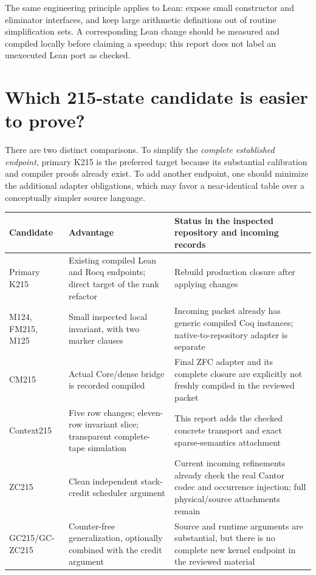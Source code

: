 \documentclass[11pt]{article}
\begin{document}
The same engineering principle applies to Lean: expose small constructor and eliminator interfaces, and keep large arithmetic definitions out of routine simplification sets. A corresponding Lean change should be measured and compiled locally before claiming a speedup; this report does not label an unexecuted Lean port as checked.

\section{Which 215-state candidate is easier to prove?}

There are two distinct comparisons. To simplify the \emph{complete established endpoint}, primary K215 is the preferred target because its substantial calibration and compiler proofs already exist. To add another endpoint, one should minimize the additional adapter obligations, which may favor a near-identical table over a conceptually simpler source language.

\begin{longtable}{@{}>{\raggedright\arraybackslash}p{}>{\raggedright\arraybackslash}p{}>{\raggedright\arraybackslash}p{}@{}}
\toprule
Candidate & Advantage & Status in the inspected repository and incoming records\\
\midrule\endhead
Primary K215 & Existing compiled Lean and Rocq endpoints; direct target of the rank refactor & Rebuild production closure after applying changes\\
M124, FM215, M125 & Small inspected local invariant, with two marker clauses & Incoming packet already has generic compiled Coq instances; native-to-repository adapter is separate\\
CM215 & Actual Core/dense bridge is recorded compiled & Final ZFC adapter and its complete closure are explicitly not freshly compiled in the reviewed packet\\
Context215 & Five row changes; eleven-row invariant slice; transparent complete-tape simulation & This report adds the checked concrete transport and exact sparse-semantics attachment\\
ZC215 & Clean independent stack-credit scheduler argument & Current incoming refinements already check the real Cantor codec and occurrence injection; full physical/source attachments remain\\
GC215/GC-ZC215 & Counter-free generalization, optionally combined with the credit argument & Source and runtime arguments are substantial, but there is no complete new kernel endpoint in the reviewed material\\
\bottomrule
\end{longtable}
\end{document}
